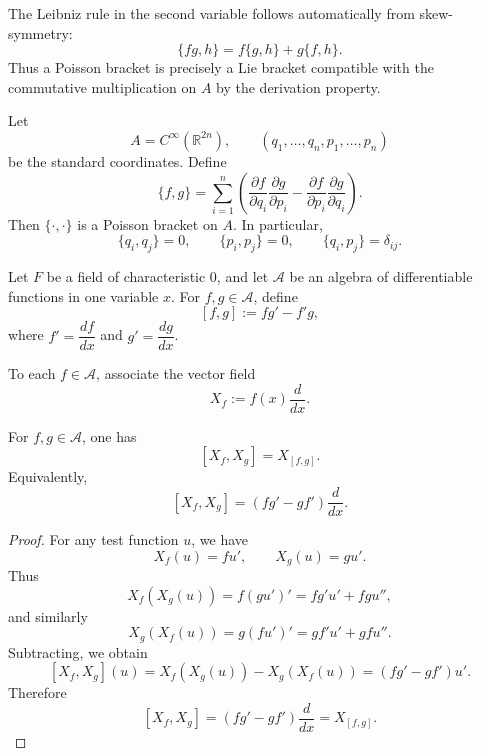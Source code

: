 \begin{remark}
    The Leibniz rule in the second variable follows automatically from skew-symmetry:
    \[
        \{fg,h\}=f\{g,h\}+g\{f,h\}.
    \]
    Thus a Poisson bracket is precisely a Lie bracket compatible with the
    commutative multiplication on $A$ by the derivation property.
\end{remark}

\begin{example}
    Let
    \[
        A=C^\infty(\mathbb{R}^{2n}),
        \qquad
        (q_1,\dots,q_n,p_1,\dots,p_n)
    \]
    be the standard coordinates. Define
    \[
        \{f,g\}
        =
        \sum_{i=1}^n
        \left(
        \frac{\partial f}{\partial q_i}\frac{\partial g}{\partial p_i}
        -
        \frac{\partial f}{\partial p_i}\frac{\partial g}{\partial q_i}
        \right).
    \]
    Then $\{\cdot,\cdot\}$ is a Poisson bracket on $A$.
    In particular,
    \[
        \{q_i,q_j\}=0,\qquad
        \{p_i,p_j\}=0,\qquad
        \{q_i,p_j\}=\delta_{ij}.
    \]
\end{example}

\begin{definition}
    Let $F$ be a field of characteristic $0$, and let $\mathcal{A}$ be an algebra of differentiable functions in one variable $x$.
    For $f,g\in \mathcal{A}$, define
    \[
        [f,g]:=fg'-f'g,
    \]
    where $f'=\dfrac{df}{dx}$ and $g'=\dfrac{dg}{dx}$.
\end{definition}

\begin{definition}
    To each $f\in \mathcal{A}$, associate the vector field
    \[
        X_f:=f(x)\frac{d}{dx}.
    \]
\end{definition}

\begin{proposition}
    For $f,g\in \mathcal{A}$, one has
    \[
        [X_f,X_g]=X_{[f,g]}.
    \]
    Equivalently,
    \[
        [X_f,X_g]=\left(fg'-gf'\right)\frac{d}{dx}.
    \]
\end{proposition}

\begin{proof}
    For any test function $u$, we have
    \[
        X_f(u)=fu', \qquad X_g(u)=gu'.
    \]
    Thus
    \[
        X_f(X_g(u))=f(gu')'=fg'u'+fgu'',
    \]
    and similarly
    \[
        X_g(X_f(u))=g(fu')'=gf'u'+gfu''.
    \]
    Subtracting, we obtain
    \[
        [X_f,X_g](u)=X_f(X_g(u))-X_g(X_f(u))=(fg'-gf')u'.
    \]
    Therefore
    \[
        [X_f,X_g]=\left(fg'-gf'\right)\frac{d}{dx}=X_{[f,g]}.
    \]
\end{proof}

